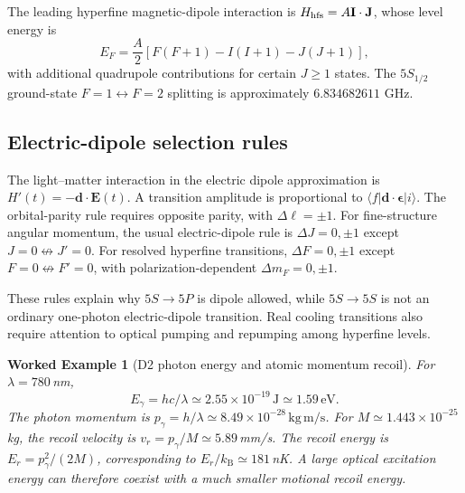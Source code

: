 \documentclass[11pt,a4paper]{article}
\newtheorem{example}{Worked Example}
\newcommand{\kb}{k_{\mathrm B}}
\begin{document}
The leading hyperfine magnetic-dipole interaction is $H_{\rm hfs}=A\mathbf I\cdot\mathbf J$, whose level energy is
\begin{equation}
E_F=\frac{A}{2}[F(F+1)-I(I+1)-J(J+1)],
\end{equation}
with additional quadrupole contributions for certain $J\geq1$ states. The $5S_{1/2}$ ground-state $F=1\leftrightarrow F=2$ splitting is approximately $6.834682611$ GHz.

\begin{center}
\end{center}

\subsection{Electric-dipole selection rules}
The light--matter interaction in the electric dipole approximation is $H'(t)=-\mathbf d\cdot\mathbf E(t)$. A transition amplitude is proportional to $\langle f|\mathbf d\cdot\boldsymbol\epsilon|i\rangle$. The orbital-parity rule requires opposite parity, with $\Delta\ell=\pm1$. For fine-structure angular momentum, the usual electric-dipole rule is $\Delta J=0,\pm1$ except $J=0\not\leftrightarrow J'=0$. For resolved hyperfine transitions, $\Delta F=0,\pm1$ except $F=0\not\leftrightarrow F'=0$, with polarization-dependent $\Delta m_F=0,\pm1$.

These rules explain why $5S\to5P$ is dipole allowed, while $5S\to5S$ is not an ordinary one-photon electric-dipole transition. Real cooling transitions also require attention to optical pumping and repumping among hyperfine levels.

\begin{example}[D2 photon energy and atomic momentum recoil]
For $\lambda=780\,$nm,
\[E_\gamma=hc/\lambda\simeq2.55\times10^{-19}\,\mathrm J\simeq1.59\,\mathrm{eV}.\]
The photon momentum is $p_\gamma=h/\lambda\simeq8.49\times10^{-28}\,\mathrm{kg\,m/s}$. For $M\simeq1.443\times10^{-25}\,$kg, the recoil velocity is $v_r=p_\gamma/M\simeq5.89\,$mm/s. The recoil energy is $E_r=p_\gamma^2/(2M)$, corresponding to $E_r/\kb\simeq181\,$nK. A large optical excitation energy can therefore coexist with a much smaller motional recoil energy.
\end{example}
\end{document}
